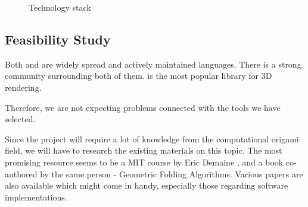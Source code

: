 \begin{figure}[H]
	\caption{Technology stack}
	\centering
\end{figure}


\subsection{Feasibility Study}

Both  and  are widely spread and actively maintained languages.
There is a strong community surrounding both of them.
 is the most popular library for 3D  rendering.

Therefore, we are not expecting problems connected with the tools we have selected.

Since the project will require a lot of knowledge from the computational origami
field, we will have to research the existing materials on this topic.
The most promising resource seems to be a MIT course by
Eric Demaine \cite{mit-course}, and a book co-authored by the same person -
Geometric Folding Algorithms\cite{origami-book}.
Various papers are also available which might come in handy, especially those regarding software implementations.


